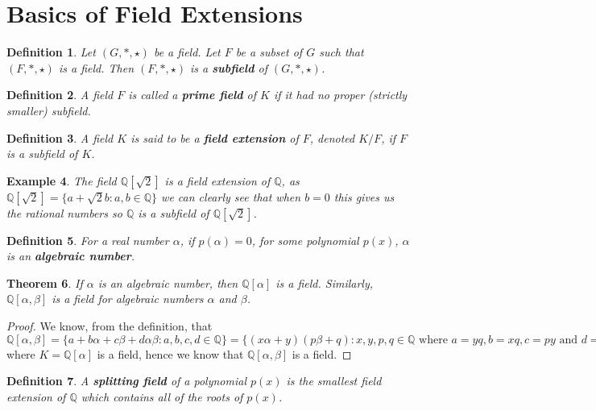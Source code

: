 \documentclass[12pt]{article}
\newtheorem{theorem}{Theorem}
\newtheorem{definition}[theorem]{Definition}
\newtheorem{example}[theorem]{Example}
\begin{document}
\section{Basics of Field Extensions}
\begin{definition}
    Let \((G, *,\star )\) be a field. Let \(F\) be a subset of \(G\) such that
    \((F,*,\star)\) is a field. Then \((F, *,\star)\) is a \textbf{subfield}
    of \((G, *, \star)\).
\end{definition}
\begin{definition}
    A field \(F\) is called a \textbf{prime field} of \(K\) if it had no proper
    (strictly smaller) subfield.
\end{definition}
\begin{definition}
    A field \(K\) is said to be a \textbf{field extension} of \(F\), denoted
    \(K /
    F\), if \(F\) is a subfield of \(K\). \cite{Moy}
\end{definition}
\begin{example}
    The field \(\mathbb{Q}[\sqrt{2}]\) is a field extension of \(\mathbb{Q}\),
    as
    \(\mathbb{Q}[\sqrt{2}] = \{a + \sqrt{2}b : a,b \in \mathbb{Q}\}\) we can
    clearly see that when \(b = 0\) this gives us the rational numbers so
    \(\mathbb{Q}\) is a subfield of \(\mathbb{Q}[\sqrt{2}]\).
\end{example}
\begin{definition}
    For a real number \(\alpha\), if \(p(\alpha)=0\), for some polynomial
    \(p(x)\),
    \(\alpha\) is an \textbf{\textit{algebraic number}}.
\end{definition}
\begin{theorem}
    If \(\alpha\) is an algebraic number, then \(\mathbb{Q}[\alpha]\) is a
    field.
    Similarly, \(\mathbb{Q}[\alpha,\beta]\) is a field for algebraic numbers
    \(\alpha\) and \(\beta\).
\end{theorem}
\begin{proof}
    We know, from the definition, that \(\mathbb{Q}[\alpha,\beta] = \{a +
    b\alpha +
    c\beta + d\alpha\beta : a,b,c,d \in \mathbb{Q}\} = \{(x\alpha + y)(p\beta +
    q)
    : x,y,p,q \in \mathbb{Q} \text{ where } a = yq, b = xq, c = py \text{ and }
    d =
    xp \} = \mathbb{Q}[\alpha,\beta] = K[\beta]\) where \(K =
    \mathbb{Q}[\alpha]\)
    is a field, hence we know that \(\mathbb{Q}[\alpha,\beta]\) is a field.
\end{proof}
\begin{definition}
    A \textbf{\textit{splitting field}} of a polynomial \(p(x)\) is the
    smallest
    field extension of \(\mathbb{Q}\) which contains all of the roots of
    \(p(x)\).
\end{definition}
\end{document}
